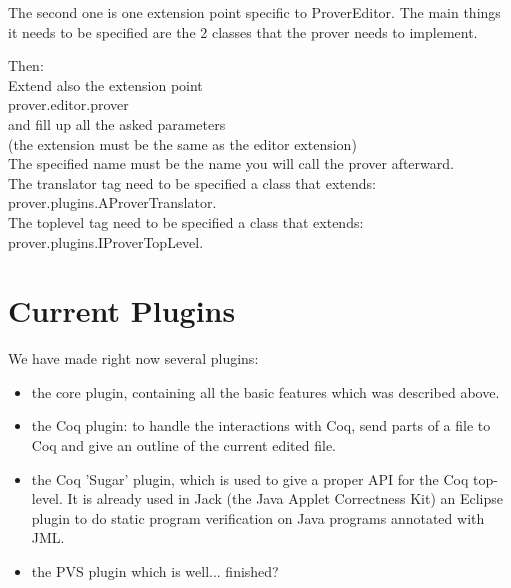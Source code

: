 \documentclass{entcs}
\begin{document}
The second one is one extension point specific to ProverEditor.
The main things it needs to be specified are the 2 classes that the prover
needs to implement.

Then:\\
Extend also the extension point\\
prover.editor.prover\\
and fill up all the asked parameters\\
(the extension must be the same as the editor extension)\\
The specified name must be the name you will call the prover afterward.\\
The translator tag need to be specified a class that extends:\\
prover.plugins.AProverTranslator.\\
The toplevel tag need to be specified a class that extends:\\
prover.plugins.IProverTopLevel.\\



\section{Current Plugins}
\label{sec:current-plugins}

We have made right now several plugins:
\begin{itemize}
\item the core plugin, containing all the basic features which was 
described above.
\item the Coq plugin: to handle the interactions with Coq, send parts of a 
file to Coq
and give an outline of the current edited file.
\item the Coq 'Sugar' plugin, which is used to give a proper API for the 
Coq top-level.
It is already used in Jack \cite{Jack-Web} (the Java Applet Correctness Kit) 
an Eclipse plugin to do static program verification on Java programs 
annotated with JML.

\item the PVS plugin which is well... finished?
\end{itemize}
\end{document}
